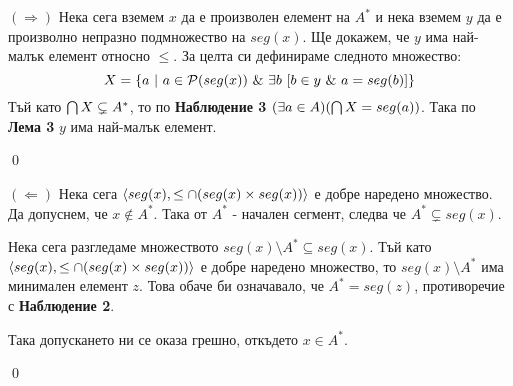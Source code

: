 \quad
$(\Rightarrow)$ Нека сега вземем $x$ да е произволен елемент на $A^*$
и нека вземем $y$ да е произволно непразно подмножество на $seg(x)$.
Ще докажем, че $y$ има най-малък елемент относно $\leq$.
За целта си дефинираме следното множество:
\[
X = \{ a\ |\ a \in \pow(seg(x)) \land \exists b\ [ b \in y \land  a = seg(b)] \}
\]
\quad
Тъй като $\bigcap X \subsetneq A^*$, то по \textbf{Наблюдение 3}
$(\exists a \in A)(\bigcap X = seg(a))$.
Така по \textbf{Лема 3} $y$ има най-малък елемент.

\qed

\quad
$(\Leftarrow)$ Нека сега
$\langle seg(x), \leq \cap (seg(x) \times seg(x)) \rangle$
е добре наредено множество.
Да допуснем, че $x \notin A^*$.
Така от $A^*$ - начален сегмент, следва че $A^* \subsetneq seg(x)$.

\quad
Нека сега разгледаме множеството $seg(x) \setminus A^* \subseteq seg(x)$.
Тъй като
$\langle seg(x), \leq \cap (seg(x) \times seg(x)) \rangle$
е добре наредено множество, то $seg(x) \setminus A^*$ има минимален елемент $z$.
Това обаче би означавало, че $A^* = seg(z)$, противоречие с \textbf{Наблюдение 2}.

\quad
Така допускането ни се оказа грешно, откъдето $x \in A^*$.

\qed
